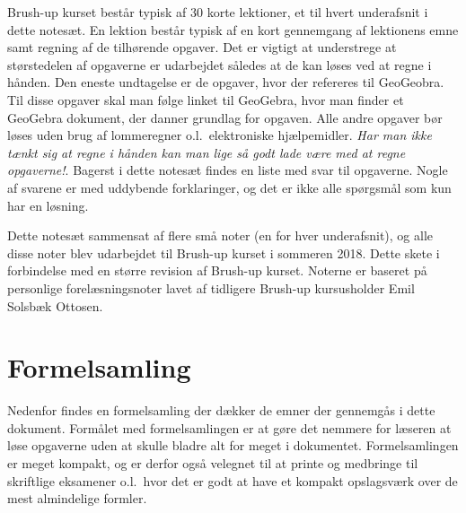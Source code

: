 Brush-up kurset består typisk af 30 korte lektioner, et til hvert underafsnit i dette notesæt. En lektion består typisk af en kort gennemgang af lektionens emne samt regning af de tilhørende opgaver. Det er vigtigt at understrege at størstedelen af opgaverne er udarbejdet således at de kan løses ved at regne i hånden. Den eneste undtagelse er de opgaver, hvor der refereres til GeoGeobra. Til disse opgaver skal man følge linket til GeoGebra, hvor man finder et GeoGebra dokument, der danner grundlag for opgaven. Alle andre opgaver bør løses uden brug af lommeregner o.l.\ elektroniske hjælpemidler. \emph{Har man ikke tænkt sig at regne i hånden kan man lige så godt lade være med at regne opgaverne!}. Bagerst i dette notesæt findes en liste med svar til opgaverne. Nogle af svarene er med uddybende forklaringer, og det er ikke alle spørgsmål som kun har en løsning.

Dette notesæt sammensat af flere små noter (en for hver underafsnit), og alle disse noter blev udarbejdet til Brush-up kurset i sommeren 2018. Dette skete i forbindelse med en større revision af Brush-up kurset. Noterne er baseret på personlige forelæsningsnoter lavet af tidligere Brush-up kursusholder Emil Solsbæk Ottosen. 


\pagestyle{fancy}
\chapter{Formelsamling}
Nedenfor findes en formelsamling der dækker de emner der gennemgås i dette dokument. Formålet med formelsamlingen er at gøre det nemmere for læseren at løse opgaverne uden at skulle bladre alt for meget i dokumentet. Formelsamlingen er meget kompakt, og er derfor også velegnet til at printe og medbringe til skriftlige eksamener o.l.\ hvor det er godt at have et kompakt opslagsværk over de mest almindelige formler. 
{ 
    \fontsize{8pt}{0.5pt}\selectfont
    \setlength{\abovedisplayskip}{1pt}
    \setlength{\belowdisplayskip}{1pt}
    \pagestyle{empty}
    \setlength{\parindent}{0pt}
    \small
    \begin{multicols*}{3}
        
        
        
        
        
        
        
    \end{multicols*}
    }
\restoregeometry
{}

